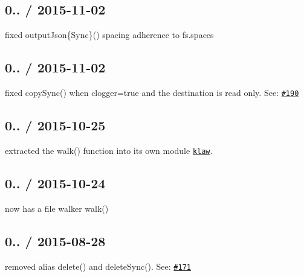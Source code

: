 \subsection*{0.. / 2015-\/11-\/02 }


\begin{DoxyItemize}
\item fixed {\ttfamily output\+Json\{Sync\}()} spacing adherence to {\ttfamily fs.\+spaces}
\end{DoxyItemize}

\subsection*{0.. / 2015-\/11-\/02 }


\begin{DoxyItemize}
\item fixed {\ttfamily copy\+Sync()} when {\ttfamily clogger=true} and the destination is read only. See\+: \href{https://github.com/jprichardson/node-fs-extra/pull/190}{\tt \#190}
\end{DoxyItemize}

\subsection*{0.. / 2015-\/10-\/25 }


\begin{DoxyItemize}
\item extracted the {\ttfamily walk()} function into its own module \href{https://github.com/jprichardson/node-klaw}{\tt {\ttfamily klaw}}.
\end{DoxyItemize}

\subsection*{0.. / 2015-\/10-\/24 }


\begin{DoxyItemize}
\item now has a file walker {\ttfamily walk()}
\end{DoxyItemize}

\subsection*{0.. / 2015-\/08-\/28 }


\begin{DoxyItemize}
\item removed alias {\ttfamily delete()} and {\ttfamily delete\+Sync()}. See\+: \href{https://github.com/jprichardson/node-fs-extra/issues/171}{\tt \#171}
\end{DoxyItemize}

